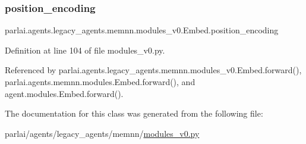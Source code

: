 \subsubsection{\texorpdfstring{position\+\_\+encoding}{position\_encoding}}
{\footnotesize\ttfamily parlai.\+agents.\+legacy\+\_\+agents.\+memnn.\+modules\+\_\+v0.\+Embed.\+position\+\_\+encoding}



Definition at line 104 of file modules\+\_\+v0.\+py.



Referenced by parlai.\+agents.\+legacy\+\_\+agents.\+memnn.\+modules\+\_\+v0.\+Embed.\+forward(), parlai.\+agents.\+memnn.\+modules.\+Embed.\+forward(), and agent.\+modules.\+Embed.\+forward().



The documentation for this class was generated from the following file\+:\begin{DoxyCompactItemize}
\item 
parlai/agents/legacy\+\_\+agents/memnn/\hyperlink{memnn_2modules__v0_8py}{modules\+\_\+v0.\+py}\end{DoxyCompactItemize}
